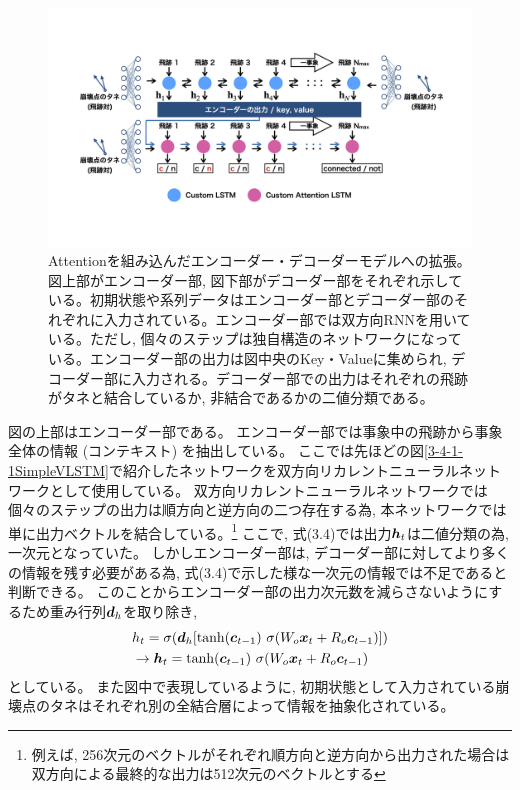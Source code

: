 \begin{figure}[htbp]
 \centering
 \includegraphics[trim = 100 200 100 100, width=1.0\textwidth, clip]{Figure/3Networks/3-4-1-4EncoderDecoderVLSTM.png}
 \caption[Attentionを組み込んだエンコーダー・デコーダーモデルへの拡張]{Attentionを組み込んだエンコーダー・デコーダーモデルへの拡張。図上部がエンコーダー部, 図下部がデコーダー部をそれぞれ示している。初期状態や系列データはエンコーダー部とデコーダー部のそれぞれに入力されている。エンコーダー部では双方向RNNを用いている。ただし, 個々のステップは独自構造のネットワークになっている。エンコーダー部の出力は図中央のKey・Valueに集められ, デコーダー部に入力される。デコーダー部での出力はそれぞれの飛跡がタネと結合しているか, 非結合であるかの二値分類である。}
 \label{3-4-1-4EncoderDecoderVLSTM}
\end{figure}

図の上部はエンコーダー部である。
エンコーダー部では事象中の飛跡から事象全体の情報 (コンテキスト) を抽出している。
ここでは先ほどの図\ref{3-4-1-1SimpleVLSTM}で紹介したネットワークを双方向リカレントニューラルネットワークとして使用している。
双方向リカレントニューラルネットワークでは個々のステップの出力は順方向と逆方向の二つ存在する為, 本ネットワークでは単に出力ベクトルを結合している。\footnote{例えば, 256次元のベクトルがそれぞれ順方向と逆方向から出力された場合は双方向による最終的な出力は512次元のベクトルとする}
ここで, 式(3.4)では出力${\mbox{\boldmath{$h$}}}_{t}$は二値分類の為, 一次元となっていた。
しかしエンコーダー部は, デコーダー部に対してより多くの情報を残す必要がある為, 式(3.4)で示した様な一次元の情報では不足であると判断できる。
このことからエンコーダー部の出力次元数を減らさないようにするため重み行列${\mbox{\boldmath{$d$}}}_h$を取り除き, 
\begin{equation}
 \begin{split}
  &h_{t} 
  = \sigma ({\mbox{\boldmath{$d$}}}_h [\tanh({\mbox{\boldmath{$c$}}}_{t-1}) \  \sigma (W_o {\mbox{\boldmath{$x$}}}_t + R_o {\mbox{\boldmath{$c$}}}_{t-1}) ])\\
  &\to {\mbox{\boldmath{$h$}}}_{t} 
  = \tanh({\mbox{\boldmath{$c$}}}_{t-1}) \  \sigma (W_o {\mbox{\boldmath{$x$}}}_t + R_o {\mbox{\boldmath{$c$}}}_{t-1})
 \end{split}
\end{equation}
としている。
また図中で表現しているように, 初期状態として入力されている崩壊点のタネはそれぞれ別の全結合層によって情報を抽象化されている。\\

